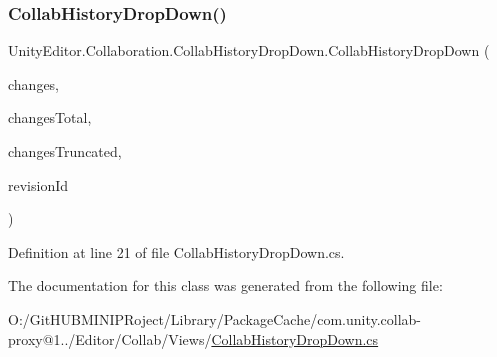 \subsubsection{\texorpdfstring{CollabHistoryDropDown()}{CollabHistoryDropDown()}}
{\footnotesize\ttfamily Unity\+Editor.\+Collaboration.\+Collab\+History\+Drop\+Down.\+Collab\+History\+Drop\+Down (\begin{DoxyParamCaption}\item[{I\+Collection$<$ Change\+Data $>$}]{changes,  }\item[{int}]{changes\+Total,  }\item[{bool}]{changes\+Truncated,  }\item[{string}]{revision\+Id }\end{DoxyParamCaption})}



Definition at line 21 of file Collab\+History\+Drop\+Down.\+cs.



The documentation for this class was generated from the following file\+:\begin{DoxyCompactItemize}
\item 
O\+:/\+Git\+H\+U\+B\+M\+I\+N\+I\+P\+Roject/\+Library/\+Package\+Cache/com.\+unity.\+collab-\/proxy@1../\+Editor/\+Collab/\+Views/\mbox{\hyperlink{_collab_history_drop_down_8cs}{Collab\+History\+Drop\+Down.\+cs}}\end{DoxyCompactItemize}
